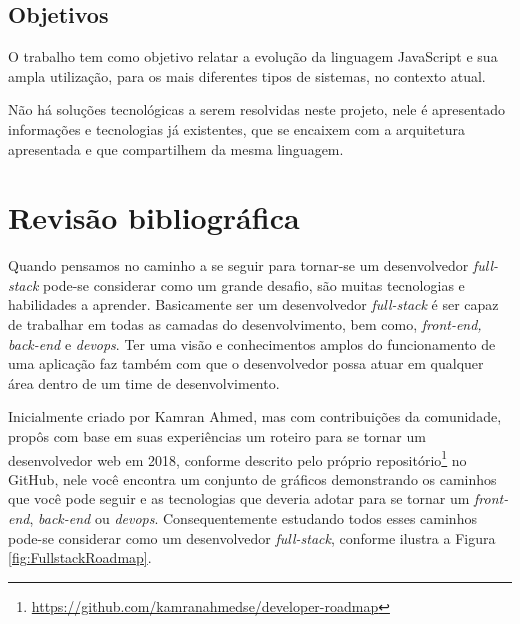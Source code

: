 \documentclass[
	12pt,				%
	openright,			%
	twoside,			%
	a4paper,			%
	english,			%
	brazil				%
	]{abntex2}
\begin{document}
\section{Objetivos}

O trabalho tem como objetivo relatar a evolução da linguagem JavaScript e sua ampla utilização, para os mais diferentes tipos de sistemas, no contexto atual.

Não há soluções tecnológicas a serem resolvidas neste projeto, nele é apresentado informações e tecnologias já existentes, que se encaixem com a arquitetura apresentada e que compartilhem da mesma linguagem.

\chapter{Revisão bibliográfica}


Quando pensamos no caminho a se seguir para tornar-se um desenvolvedor \textit{full-stack} pode-se considerar como um grande desafio, são muitas tecnologias e habilidades a aprender. Basicamente ser um desenvolvedor \textit{full-stack} é ser capaz de trabalhar em todas as camadas do desenvolvimento, bem como, \textit{front-end, back-end} e \textit{devops}. Ter uma visão e conhecimentos amplos do funcionamento de uma aplicação faz também com que o desenvolvedor possa atuar em qualquer área dentro de um time de desenvolvimento.

Inicialmente criado por Kamran Ahmed\cite{ahmedse_roadmap}, mas com contribuições da comunidade, propôs com base em suas experiências um roteiro para se tornar um desenvolvedor web em 2018, conforme descrito pelo próprio repositório\footnote{\url{https://github.com/kamranahmedse/developer-roadmap}} no GitHub, nele você encontra um conjunto de gráficos demonstrando os caminhos que você pode seguir e as tecnologias que deveria adotar para se tornar um \textit{front-end}, \textit{back-end} ou \textit{devops}. Consequentemente estudando todos esses caminhos pode-se considerar como um desenvolvedor \textit{full-stack}, conforme ilustra a Figura \ref{fig:FullstackRoadmap}.
\end{document}
